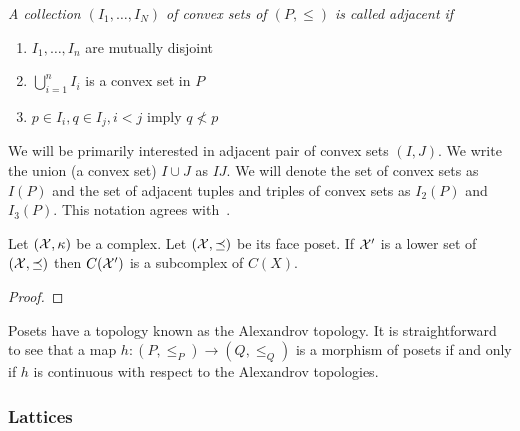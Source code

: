 \begin{defn}
{\em
A collection $(I_1,\ldots, I_N)$ of convex sets of $(P,\leq)$ is called {\em adjacent} if
\begin{enumerate}
\item $I_1,\ldots,I_n$ are mutually disjoint
\item $\bigcup_{i=1}^n I_i$ is a convex set in $P$
\item $p\in I_i, q\in I_j, i < j$ imply $q \nless p$
\end{enumerate}
}
\end{defn}

We will be primarily interested in adjacent pair of convex sets $(I,J)$.  We write the union (a convex set) $I\cup J$ as $IJ$.  We will denote the set of convex sets as $I(P)$ and the set of adjacent tuples and triples of convex sets as $I_2(P)$ and $I_3(P)$.  This notation agrees with~\cite{fran}.


\begin{prop}\label{cor:clsubcomplex}
Let $({\mathcal X},\kappa)$ be a complex.  Let $({\mathcal X},\preceq)$ be its face poset.  If ${\mathcal X}'$ is a lower set of $({\mathcal X},\preceq)$ then $C({\mathcal X}')$ is a subcomplex of $C(X)$.
\end{prop}
\begin{proof}

\end{proof}

Posets have a topology known as the Alexandrov topology.  It is straightforward to see that a map $h:(P,\leq_P)\to (Q,\leq_Q)$ is a morphism of posets if and only if $h$ is continuous with respect to the Alexandrov topologies.


\subsubsection{Lattices}

